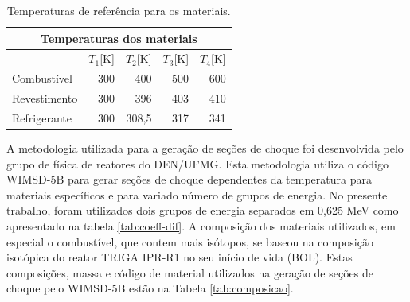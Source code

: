 \begin{table}[htb]
\centering
\caption{Temperaturas de referência para os materiais.}
\label{tab:temp}
\begin{tabular}{lrrrr}
\multicolumn{5}{c}{Temperaturas dos materiais}                                                                                                       \\ \hline
             & \multicolumn{1}{l}{$T_1${[}K{]}} & \multicolumn{1}{l}{$T_2${[}K{]}} & \multicolumn{1}{l}{$T_3${[}K{]}} & \multicolumn{1}{l}{$T_4${[}K{]}}      \\ \hline
Combustível  & 300                             & 400                             & 500                             & 600                             \\ \hline
Revestimento & 300                             & 396                             & 403                             & 410                             \\ \hline
Refrigerante & 300                             & 308,5                           & 317                             & 341                            
\end{tabular}
\end{table}

A metodologia utilizada para a geração de seções de choque \cite{Reis2015}
foi desenvolvida pelo grupo de física de reatores do DEN/UFMG. Esta metodologia
utiliza o código WIMSD-5B \cite{Halsall1986} para gerar seções de choque dependentes da temperatura
para materiais específicos e para variado número de grupos de energia. No presente
trabalho, foram utilizados dois grupos de energia separados em 0,625 MeV como
apresentado na tabela \ref{tab:coeff-dif}. A composição dos materiais utilizados,
em especial o combustível, que contem mais isótopos, se baseou na composição
isotópica do reator TRIGA IPR-R1 no seu início de vida (BOL). Estas composições, massa e código
de material utilizados na geração de seções
de choque pelo WIMSD-5B estão na Tabela \ref{tab:composicao}.


